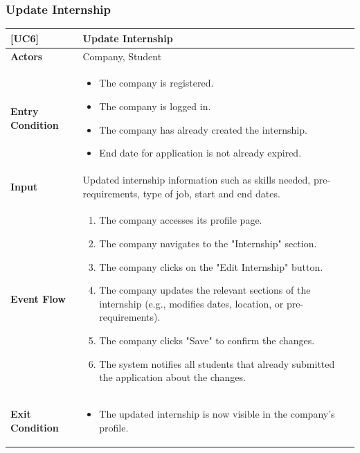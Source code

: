\subsubsection*{Update Internship}
\begin{table}[H]
    \centering
    \renewcommand{\arraystretch}{1.5}
    \begin{tabular}{|p{4cm}|p{11cm}|}
    \hline
    \rowcolor{bluepoli!40}
    \textbf{[UC6]} & \textbf{Update Internship} \\ \hline \hline
    \textbf{Actors} & Company, Student \\ \hline
    \textbf{Entry Condition} & 
    {\setlength{\leftmargini}{1.1em}
    \begin{itemize}
        \item The company is registered.
        \item The company is logged in.
        \item The company has already created the internship.
        \item End date for application is not already expired.
    \end{itemize}} \\ \hline
    \textbf{Input} & Updated internship information such as skills needed, pre-requirements, type of job, start and end dates. \\ \hline
    \textbf{Event Flow} & 
    {\setlength{\leftmargini}{1.4em}
    \begin{enumerate}
        \item The company accesses its profile page.
        \item The company navigates to the "Internship" section.
        \item The company clicks on the "Edit Internship" button.
        \item The company updates the relevant sections of the internship (e.g., modifies dates, location, or pre-requirements).
        \item The company clicks "Save" to confirm the changes.
        \item The system notifies all students that already submitted the application about the changes.
    \end{enumerate}} \\ \hline
    \textbf{Exit Condition} & 
    {\setlength{\leftmargini}{1.1em}
    \begin{itemize}
        \item The updated internship is now visible in the company's profile.

\end{itemize}}
\end{tabular}
\end{table}
